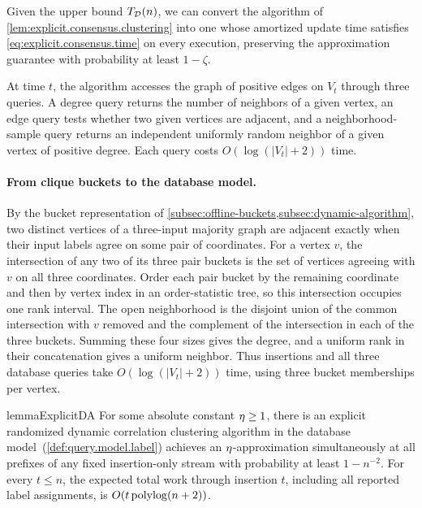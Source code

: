 \begin{remark}
Given the upper bound $ T_{\mathcal D}(n) $, we can convert the algorithm of \cref{lem:explicit.consensus.clustering} into one whose amortized update time satisfies \eqref{eq:explicit.consensus.time} on every execution, preserving the approximation guarantee with probability at least $ 1-\zeta $.
\end{remark}

\begin{definition}\label{def:query.model.label}
At time $ t $, the algorithm accesses the graph of positive edges on $ V_t $ through three queries.
A degree query returns the number of neighbors of a given vertex, an edge query tests whether two given vertices are adjacent, and a neighborhood-sample query returns an independent uniformly random neighbor of a given vertex of positive degree.
Each query costs $ O(\log(|V_t|+2)) $ time.
\end{definition}

\paragraph{From clique buckets to the database model.}\label{par:explicit.bucket.queries}
By the bucket representation of \cref{subsec:offline-buckets,subsec:dynamic-algorithm}, two distinct vertices of a three-input majority graph are adjacent exactly when their input labels agree on some pair of coordinates.
For a vertex $ v $, the intersection of any two of its three pair buckets is the set of vertices agreeing with $ v $ on all three coordinates.
Order each pair bucket by the remaining coordinate and then by vertex index in an order-statistic tree, so this intersection occupies one rank interval.
The open neighborhood is the disjoint union of the common intersection with $ v $ removed and the complement of the intersection in each of the three buckets.
Summing these four sizes gives the degree, and a uniform rank in their concatenation gives a uniform neighbor.
Thus insertions and all three database queries take $ O(\log(|V_t|+2)) $ time, using three bucket memberships per vertex.

\begin{restatable}{lemma}{ExplicitDA}\label{lem:explicit.correlation.clustering}
For some absolute constant $ \eta\ge1 $, there is an explicit randomized dynamic correlation clustering algorithm in the database model~(\cref{def:query.model.label}) achieves an $ \eta $-approximation simultaneously at all prefixes of any fixed insertion-only stream with probability at least $ 1-n^{-2} $.
For every $ t\le n $, the expected total work through insertion $ t $, including all reported label assignments, is $ O(t\operatorname{polylog}(n+2)) $.
\end{restatable}

